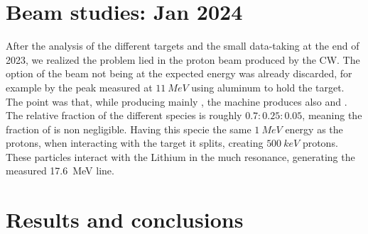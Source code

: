 \begin{refsection}
\section{Beam studies: Jan 2024}
    After the analysis of the different targets and the small data-taking at the end of 2023, we realized the problem lied in the proton beam produced by the CW.
    The option of the beam not being at the expected energy was already discarded, for example by the peak measured at $\SI{11}{MeV}$ using aluminum to hold the target.
    The point was that, while producing mainly , the machine produces also  and .
    The relative fraction of the different species is roughly $0.7:0.25:0.05$, meaning the fraction of  is non negligible.
    Having this specie the same $\SI{1}{MeV}$ energy as the protons, when interacting with the target it splits, creating  $\SI{500}{keV}$ protons.
    These particles interact with the Lithium in the much resonance, generating the measured \SI{17.6}{MeV} line. 
\section{Results and conclusions}

\cite{X17:1996} \cite{X17:nuclear:2004} \cite{X17:Krasznahorkay:2015} \cite{X17:Ellwanger:2016} \cite{X17:Feng:2016} \cite{X17_Kozaczuk:2017} \cite{X17:Krasznahorkay:2017} \cite{X17:2019} \cite{X17:2021} 

\printbibliography[
    heading = bibliographychapter,
    title=Bibliography on X17
]

\end{refsection}
